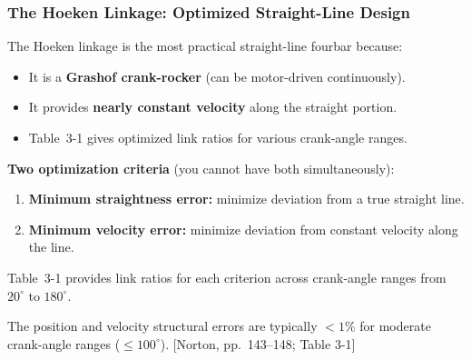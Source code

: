 \documentclass[10pt,aspectratio=43]{beamer}
\newcommand{\pref}[1]{\vfill\hfill{\scriptsize\color{gray}[Norton, pp.~#1]}}
\begin{document}
\begin{frame}
\frametitle{The Hoeken Linkage: Optimized Straight-Line Design}

The Hoeken linkage is the most practical straight-line fourbar because:
\begin{itemize}
  \item It is a \textbf{Grashof crank-rocker} (can be motor-driven continuously).
  \item It provides \textbf{nearly constant velocity} along the straight portion.
  \item Table~3-1 gives optimized link ratios for various crank-angle ranges.
\end{itemize}

\vspace{4pt}
\begin{yellowbox}
\textbf{Two optimization criteria} (you cannot have both simultaneously):
\begin{enumerate}
  \item \textbf{Minimum straightness error:} minimize deviation from a true straight line.
  \item \textbf{Minimum velocity error:} minimize deviation from constant velocity along the line.
\end{enumerate}
Table~3-1 provides link ratios for each criterion across crank-angle ranges from $20^\circ$ to $180^\circ$.
\end{yellowbox}

\vspace{4pt}
The position and velocity structural errors are typically $< 1\%$ for moderate crank-angle ranges ($\leq 100^\circ$).
\pref{143--148; Table 3-1}
\end{frame}

\end{document}

